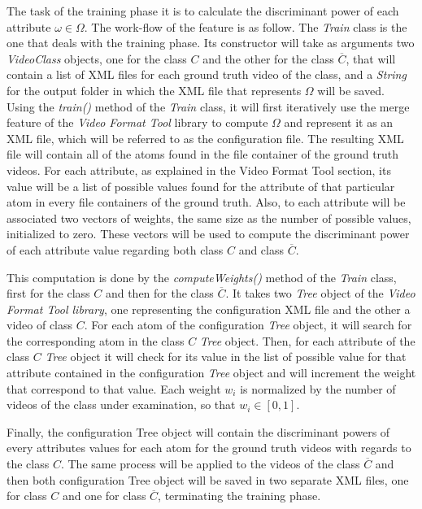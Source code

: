 The task of the training phase it is to calculate the discriminant power of each attribute $\omega \in \Omega$. The work-flow of the feature is as follow. The \emph{Train} class is the one that deals with the training phase. Its constructor will take as arguments two \emph{VideoClass} objects, one for the class $C$ and the other for the class $\overline{C}$, that will contain a list of XML files for each ground truth video of the class, and a \emph{String} for the output folder in which the XML file that represents $\Omega$ will be saved.
Using the \emph{train()} method of the \emph{Train} class, it will first iteratively use the merge feature of the \emph{Video Format Tool} library to compute $\Omega$ and represent it as an XML file, which will be referred to as the configuration file. The resulting XML file will contain all of the atoms found in the file container of the ground truth videos. For each attribute, as explained in the Video Format Tool section, its value will be a list of possible values found for the attribute of that particular atom in every file containers of the ground truth. Also, to each attribute will be associated two vectors of weights, the same size as the number of possible values, initialized to zero. These vectors will be used to compute the discriminant power of each attribute value regarding both class $C$ and class $\overline{C}$.

This computation is done by the \emph{computeWeights()} method of the \emph{Train} class, first for the class $C$ and then for the class $\overline{C}$. It takes two \emph{Tree} object of the \emph{Video Format Tool library}, one representing the configuration XML file and the other a video of class $C$. For each atom of the configuration \emph{Tree} object, it will search for the corresponding atom in the class $C$ \emph{Tree} object. Then, for each attribute of the class $C$ \emph{Tree} object it will check for its value in the list of possible value for that attribute contained in the configuration \emph{Tree} object and will increment the weight that correspond to that value. Each weight $w_{i}$ is normalized by the number of videos of the class under examination, so that $w_{i} \in \left[0, 1\right] $.

Finally, the configuration Tree object will contain the discriminant powers of every attributes values for each atom for the ground truth videos with regards to the class $C$. The same process will be applied to the videos of the class $\overline{C}$ and then both configuration Tree object will be saved in two separate XML files, one for class $C$ and one for class $\overline{C}$, terminating the training phase.


